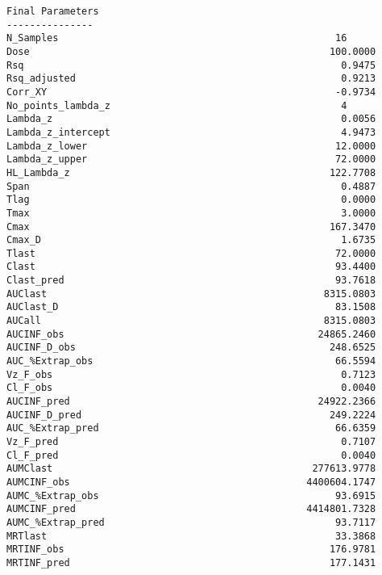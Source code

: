 \documentclass[12pt,a4paper]{article}
\begin{document}
\begin{verbatim}
Final Parameters
---------------
N_Samples                                                16
Dose                                                    100.0000
Rsq                                                       0.9475
Rsq_adjusted                                              0.9213
Corr_XY                                                  -0.9734
No_points_lambda_z                                        4
Lambda_z                                                  0.0056
Lambda_z_intercept                                        4.9473
Lambda_z_lower                                           12.0000
Lambda_z_upper                                           72.0000
HL_Lambda_z                                             122.7708
Span                                                      0.4887
Tlag                                                      0.0000
Tmax                                                      3.0000
Cmax                                                    167.3470
Cmax_D                                                    1.6735
Tlast                                                    72.0000
Clast                                                    93.4400
Clast_pred                                               93.7618
AUClast                                                8315.0803
AUClast_D                                                83.1508
AUCall                                                 8315.0803
AUCINF_obs                                            24865.2460
AUCINF_D_obs                                            248.6525
AUC_%Extrap_obs                                          66.5594
Vz_F_obs                                                  0.7123
Cl_F_obs                                                  0.0040
AUCINF_pred                                           24922.2366
AUCINF_D_pred                                           249.2224
AUC_%Extrap_pred                                         66.6359
Vz_F_pred                                                 0.7107
Cl_F_pred                                                 0.0040
AUMClast                                             277613.9778
AUMCINF_obs                                         4400604.1747
AUMC_%Extrap_obs                                         93.6915
AUMCINF_pred                                        4414801.7328
AUMC_%Extrap_pred                                        93.7117
MRTlast                                                  33.3868
MRTINF_obs                                              176.9781
MRTINF_pred                                             177.1431




\end{verbatim}
\end{document}

